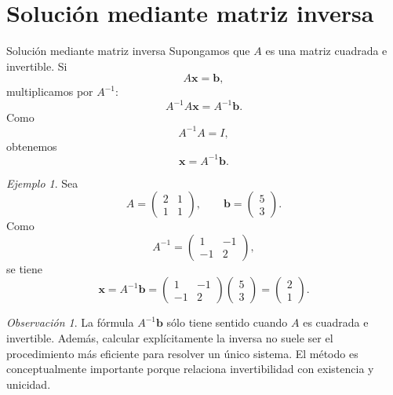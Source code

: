 \documentclass[aspectratio=169,9pt]{beamer}
\theoremstyle{remark}
\newtheorem{observacion}[definicion]{Observación}
\newtheorem{ejemplo}[definicion]{Ejemplo}
\begin{document}
\section{Solución mediante matriz inversa}
\begin{frame}[allowframebreaks,t]{Solución mediante matriz inversa}
Supongamos que $A$ es una matriz cuadrada e invertible. Si
\[
A\mathbf{x}=\mathbf b,
\]
multiplicamos por $A^{-1}$:
\[
A^{-1}A\mathbf{x}=A^{-1}\mathbf b.
\]
Como
\[
A^{-1}A=I,
\]
obtenemos
\[
\boxed{\mathbf{x}=A^{-1}\mathbf b.}
\]

\begin{ejemplo}
Sea
\[
A=
\begin{pmatrix}
2&1\\
1&1
\end{pmatrix},
\qquad
\mathbf b=
\begin{pmatrix}5\\3\end{pmatrix}.
\]
Como
\[
A^{-1}=
\begin{pmatrix}
1&-1\\
-1&2
\end{pmatrix},
\]
se tiene
\[
\mathbf x=A^{-1}\mathbf b
=
\begin{pmatrix}
1&-1\\
-1&2
\end{pmatrix}
\begin{pmatrix}5\\3\end{pmatrix}
=
\begin{pmatrix}2\\1\end{pmatrix}.
\]
\end{ejemplo}

\begin{observacion}
La fórmula $A^{-1}\mathbf b$ sólo tiene sentido cuando $A$ es cuadrada e invertible. Además, calcular
explícitamente la inversa no suele ser el procedimiento más eficiente para resolver un único sistema.
El método es conceptualmente importante porque relaciona invertibilidad con existencia y unicidad.
\end{observacion}
\end{frame}
\end{document}
